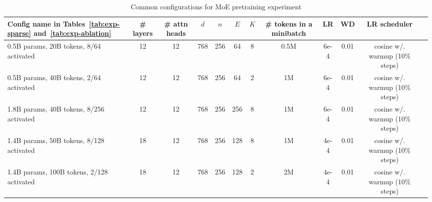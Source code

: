 \begin{table}[!ht]
\setlength{\tabcolsep}{3pt}
\renewcommand{\arraystretch}{1.15}
\fontsize{7pt}{8pt}\selectfont
\centering
\vspace{-0.6em}
\caption{Common configurations for MoE pretraining experiment}

\label{tab:config_tr}
\begin{tabular}{l!{\vrule width 0.4pt}ccccccccccc}
    \toprule
    \textbf{Config name in Tables~\ref{tab:exp-sparse} and~\ref{tab:exp-ablation}} & \textbf{\# layers} & \textbf{\# attn heads} & \textbf{$d$} & \textbf{$n$} & \textbf{$E$} & \textbf{$K$} & \textbf{\# tokens in a minibatch} & \textbf{LR} & \textbf{WD} & \textbf{LR scheduler}  \\
    
    \midrule
    
    0.5B params, 20B tokens, 8/64 activated
     & 12 & 12 & 768 & 256 & 64  & 8  & 0.5M & 6e-4 & 0.01 & cosine w/. warmup (10\% steps) \\
    
    0.5B params, 40B tokens, 2/64 activated
     & 12 & 12 & 768 & 256 & 64  & 2 & 1M & 6e-4 & 0.01 & cosine w/. warmup (10\% steps) \\
    
    1.8B params, 40B tokens, 8/256 activated
     & 12 & 12 & 768 & 256 & 256  & 8  & 1M& 6e-4 & 0.01 & cosine w/. warmup (10\% steps)  \\
    
    1.4B params, 50B tokens, 8/128 activated
     & 18 & 12 & 768 & 256 & 128  & 8  & 1M& 4e-4 & 0.01 & cosine w/. warmup (10\% steps) \\
    
    1.4B params, 100B tokens, 2/128 activated  & 18 & 12 & 768 & 256 & 128  & 2  & 2M & 4e-4 & 0.01 & cosine w/. warmup (10\% steps) \\
    
    \bottomrule
\end{tabular}
\end{table}
